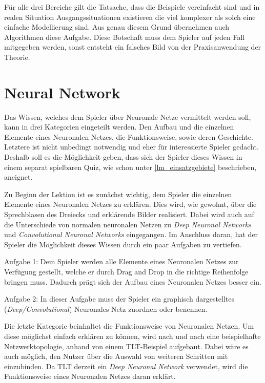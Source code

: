 Für alle drei Bereiche gilt die Tatsache, dass die Beispiele vereinfacht sind und in realen Situation Ausgangssituationen existieren die viel komplexer als solch eine einfache Modellierung sind. Aus genau diesem Grund übernehmen auch Algorithmen diese Aufgabe. Diese Botschaft muss dem Spieler auf jeden Fall mitgegeben werden, sonst entsteht ein falsches Bild von der Praxisanwendung der Theorie. 

\section{Neural Network}

Das Wissen, welches dem Spieler über Neuronale Netze vermittelt werden soll, kann in drei Kategorien eingeteilt werden. Den Aufbau und die einzelnen Elemente eines Neuronalen Netzes, die Funktionsweise, sowie deren Geschichte. Letztere ist nicht unbedingt notwendig und eher für interessierte Spieler gedacht. Deshalb soll es die Möglichkeit geben, dass sich der Spieler dieses Wissen in einem separat spielbaren Quiz, wie schon unter \ref{lm_einsatzgebiete} beschrieben, aneignet.

Zu Beginn der Lektion ist es zunächst wichtig, dem Spieler die einzelnen Elemente eines Neuronalen Netzes zu erklären. Dies wird, wie gewohnt, über die Sprechblasen des Dreiecks und erklärende Bilder realisiert. Dabei wird auch auf die Unterschiede von \glqq normalen\grqq{} neuronalen Netzen zu \textit{Deep Neuronal Networks} und \textit{Convolutional Neuronal Networks} eingegangen. Im Anschluss daran, hat der Spieler die Möglichkeit dieses Wissen durch ein paar Aufgaben zu vertiefen. 

Aufgabe 1: Dem Spieler werden alle Elemente eines Neuronalen Netzes zur Verfügung gestellt, welche er durch \glqq Drag and Drop\grqq{} in die richtige Reihenfolge bringen muss. Dadurch prägt sich der Aufbau eines Neuronalen Netzes besser ein.

Aufgabe 2: In dieser Aufgabe muss der Spieler ein graphisch dargestelltes (\textit{Deep/Convolutional}) Neuronales Netz zuordnen oder benennen.

Die letzte Kategorie beinhaltet die Funktionsweise von Neuronalen Netzen. Um diese möglichst einfach erklären zu können, wird nach und nach eine beispielhafte Netzwerktopologie, anhand von einem TLT-Beispiel aufgebaut. Dabei wäre es auch möglich, den Nutzer über die Auswahl von weiteren Schritten mit einzubinden. Da TLT derzeit ein \textit{Deep Neuronal Network} verwendet, wird die Funktionsweise eines Neuronalen Netzes daran erklärt.

